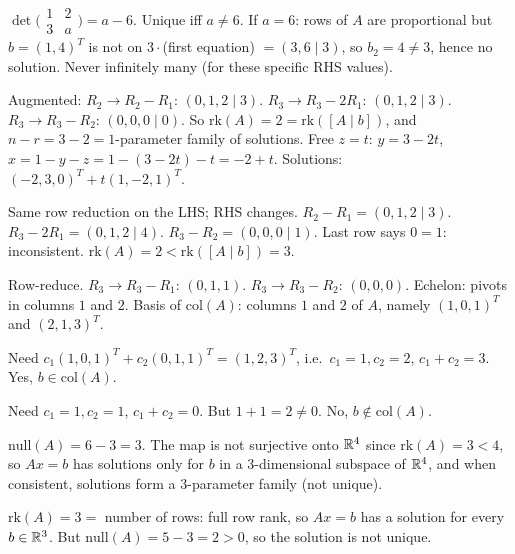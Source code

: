 \begin{solutions}
    \item $\det \bigl(\begin{smallmatrix} 1 & 2 \\ 3 & a \end{smallmatrix}\bigr) = a - 6$. Unique iff $a \neq 6$. If $a = 6$: rows of $A$ are proportional but $b = (1, 4)^{T}$ is not on $3 \cdot$(first equation) $= (3, 6 \mid 3)$, so $b_{2} = 4 \neq 3$, hence no solution. Never infinitely many (for these specific RHS values).

    \item Augmented: $R_{2} \to R_{2} - R_{1}$: $(0, 1, 2 \mid 3)$. $R_{3} \to R_{3} - 2 R_{1}$: $(0, 1, 2 \mid 3)$. $R_{3} \to R_{3} - R_{2}$: $(0, 0, 0 \mid 0)$. So $\mathrm{rk}(A) = 2 = \mathrm{rk}([A \mid b])$, and $n - r = 3 - 2 = 1$-parameter family of solutions. Free $z = t$: $y = 3 - 2 t$, $x = 1 - y - z = 1 - (3 - 2 t) - t = -2 + t$. Solutions: $(-2, 3, 0)^{T} + t (1, -2, 1)^{T}$.

    \item Same row reduction on the LHS; RHS changes. $R_{2} - R_{1} = (0, 1, 2 \mid 3)$. $R_{3} - 2 R_{1} = (0, 1, 2 \mid 4)$. $R_{3} - R_{2} = (0, 0, 0 \mid 1)$. Last row says $0 = 1$: inconsistent. $\mathrm{rk}(A) = 2 < \mathrm{rk}([A \mid b]) = 3$.

    \item Row-reduce. $R_{3} \to R_{3} - R_{1}$: $(0, 1, 1)$. $R_{3} \to R_{3} - R_{2}$: $(0, 0, 0)$. Echelon: pivots in columns $1$ and $2$. Basis of $\mathrm{col}(A)$: columns $1$ and $2$ of $A$, namely $(1, 0, 1)^{T}$ and $(2, 1, 3)^{T}$.

    \item Need $c_{1}(1, 0, 1)^{T} + c_{2}(0, 1, 1)^{T} = (1, 2, 3)^{T}$, i.e.\ $c_{1} = 1, c_{2} = 2$, $c_{1} + c_{2} = 3$. Yes, $b \in \mathrm{col}(A)$.

    \item Need $c_{1} = 1, c_{2} = 1$, $c_{1} + c_{2} = 0$. But $1 + 1 = 2 \neq 0$. No, $b \notin \mathrm{col}(A)$.

    \item $\mathrm{null}(A) = 6 - 3 = 3$. The map is not surjective onto $\mathbb{R}^{4}$ since $\mathrm{rk}(A) = 3 < 4$, so $A x = b$ has solutions only for $b$ in a $3$-dimensional subspace of $\mathbb{R}^{4}$, and when consistent, solutions form a $3$-parameter family (not unique).

    \item $\mathrm{rk}(A) = 3 = $ number of rows: full row rank, so $A x = b$ has a solution for every $b \in \mathbb{R}^{3}$. But $\mathrm{null}(A) = 5 - 3 = 2 > 0$, so the solution is not unique.


\end{solutions}
